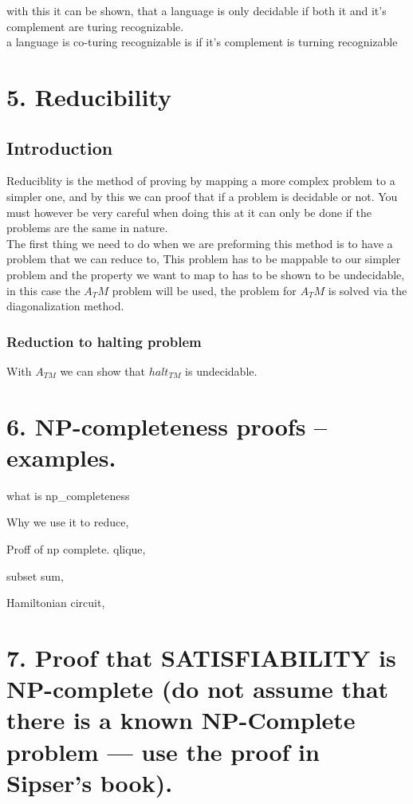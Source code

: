 \documentclass[a4paper,10pt,titlepage]{report}
\begin{document}
with this it can be shown, that a language is only decidable if both it and it's complement are turing recognizable. \\

a language is co-turing recognizable is if it's complement is turning recognizable \\





 
\newpage
\section{5. Reducibility}

\subsection{Introduction}

Reduciblity is the method of proving by mapping a more complex problem to a simpler one, and by this we can proof that if a problem is decidable or not. You must however be very careful when doing this at it can only be done if the problems are the same in nature.\\
The first thing we need to do when we are preforming this method is to have a problem that we can reduce to, This problem has to be mappable to our simpler problem and the property we want to map to has to be shown to be undecidable, in this case the $A_TM$ problem will be used, the problem for $A_TM$ is solved via the diagonalization method.
\subsubsection{Reduction to halting problem} 
With $A_{TM}$ we can show that $halt_{TM}$ is undecidable.





\newpage
\section{6. NP-completeness proofs – examples.}
what is np\_completeness

Why we use it to reduce,

Proff of np complete.
qlique, 

subset sum, 

Hamiltonian circuit, 






\newpage
\section{7. Proof that SATISFIABILITY is NP-complete (do not assume that
there is a known NP-Complete problem — use the proof in Sipser’s
book).}
\end{document}
